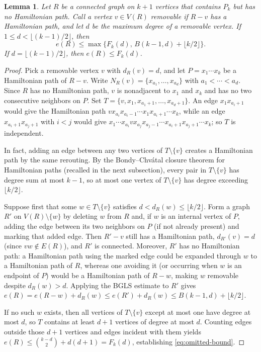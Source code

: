 \documentclass[10pt]{article}
\theoremstyle{compactplain}
\newtheorem{lemma}[theorem]{Lemma}
\theoremstyle{remark}\newtheorem{remark}[theorem]{Remark}
\begin{document}
\begin{lemma}\label{lem:omitted-vertex}
Let $R$ be a connected graph on $k+1$ vertices that contains $P_k$ but
has no Hamiltonian path. Call a vertex $v\in V(R)$ \emph{removable} if
$R-v$ has a Hamiltonian path, and let $d$ be the maximum degree of a
removable vertex. If $1\le d<\lfloor(k-1)/2\rfloor$, then
\begin{equation}\label{eq:omitted-bound}
 e(R)\le\max\bigl\{F_k(d),\,B(k-1,d)+\lfloor k/2\rfloor\bigr\}.
\end{equation}
If $d=\lfloor(k-1)/2\rfloor$, then $e(R)\le F_k(d)$.
\end{lemma}
\begin{proof}
Pick a removable vertex $v$ with $d_R(v)=d$, and let
$P=x_1\cdots x_k$ be a Hamiltonian path of $R-v$. Write
$N_R(v)=\{x_{a_1},\ldots,x_{a_d}\}$ with $a_1<\cdots<a_d$. Since $R$ has
no Hamiltonian path, $v$ is nonadjacent to $x_1$ and $x_k$ and has no
two consecutive neighbors on $P$. Set
$T=\{v,x_1,x_{a_1+1},\ldots,x_{a_d+1}\}$. An edge $x_1x_{a_i+1}$ would
give the Hamiltonian path
$vx_{a_i}x_{a_i-1}\cdots x_1x_{a_i+1}\cdots x_k$, while an edge
$x_{a_i+1}x_{a_j+1}$ with $i<j$ would give
$x_1\cdots x_{a_i}vx_{a_j}x_{a_j-1}\cdots x_{a_i+1}x_{a_j+1}\cdots x_k$;
so $T$ is independent.

In fact, adding an edge between any two vertices of $T\setminus\{v\}$
creates a Hamiltonian path by the same rerouting. By the Bondy--Chv\'atal
closure theorem for Hamiltonian paths (recalled in the next subsection),
every pair in $T\setminus\{v\}$ has degree sum at most $k-1$, so at most
one vertex of $T\setminus\{v\}$ has degree exceeding $\lfloor k/2\rfloor$.

Suppose first that some $w\in T\setminus\{v\}$ satisfies
$d<d_R(w)\le\lfloor k/2\rfloor$. Form a graph $R'$ on
$V(R)\setminus\{w\}$ by deleting $w$ from $R$ and, if $w$ is an internal
vertex of $P$, adding the edge between its two neighbors on $P$ (if not
already present) and marking that added edge. Then $R'-v$ still has a
Hamiltonian path, $d_{R'}(v)=d$ (since $vw\notin E(R)$), and $R'$ is
connected. Moreover, $R'$ has no Hamiltonian path: a Hamiltonian path
using the marked edge could be expanded through $w$ to a Hamiltonian path
of $R$, whereas one avoiding it (or occurring when $w$ is an endpoint of
$P$) would be a Hamiltonian path of $R-w$, making $w$ removable despite
$d_R(w)>d$. Applying the BGLS estimate to $R'$ gives
$e(R)=e(R-w)+d_R(w)\le e(R')+d_R(w)\le B(k-1,d)+\lfloor k/2\rfloor$.

If no such $w$ exists, then all vertices of $T\setminus\{v\}$ except at
most one have degree at most $d$, so $T$ contains at least $d+1$ vertices
of degree at most $d$. Counting edges outside those $d+1$ vertices and
edges incident with them yields
$e(R)\le\binom{k-d}{2}+d(d+1)=F_k(d)$, establishing
\eqref{eq:omitted-bound}.


\end{proof}
\end{document}
